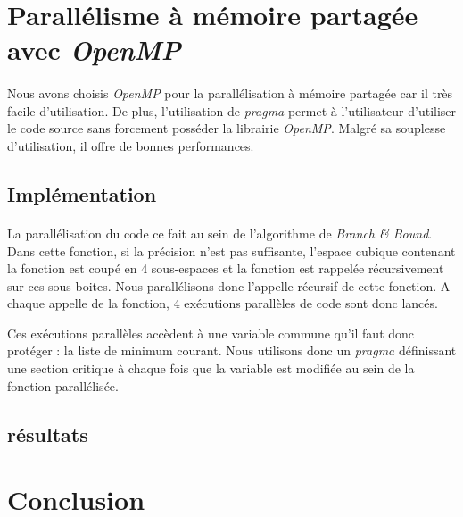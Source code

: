 \documentclass[a4paper]{article}
\begin{document}
\section{Parallélisme à mémoire partagée avec \emph{OpenMP}}
	\paragraph{}
	Nous avons choisis \emph{OpenMP} pour la parallélisation à mémoire partagée car il très facile d'utilisation. De plus, l'utilisation de \emph{pragma} permet à l'utilisateur d'utiliser le code source sans forcement posséder la librairie \emph{OpenMP}. Malgré sa souplesse d'utilisation, il offre de bonnes performances.
    \subsection{Implémentation}
    \paragraph{}
    La parallélisation du code ce fait au sein de l'algorithme de \emph{Branch \& Bound}. Dans cette fonction, si la précision n'est pas suffisante, l'espace cubique contenant la fonction est coupé en 4 sous-espaces et la fonction est rappelée récursivement sur ces sous-boites. Nous parallélisons donc l'appelle récursif de cette fonction. A chaque appelle de la fonction, 4 exécutions parallèles de code sont donc lancés.
    
    Ces exécutions parallèles accèdent à une variable commune qu'il faut donc protéger : la liste de minimum courant. Nous utilisons donc un \emph{pragma} définissant une section critique à chaque fois que la variable est modifiée au sein de la fonction parallélisée.
    \subsection{résultats}
    \paragraph{}
    
\section{Conclusion}
    \paragraph{}
    
    
\end{document}

